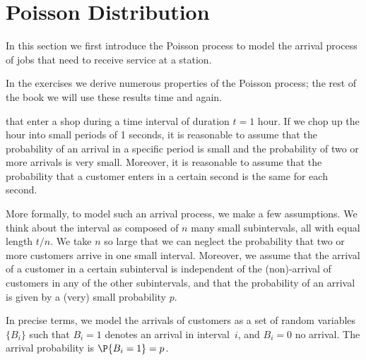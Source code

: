 


\section{Poisson Distribution}\label{sec:poisson-distribution}

In this section we first introduce the Poisson process to model the arrival process of jobs
that need to receive service at a station.

In the exercises we derive numerous properties of the Poisson process; the rest of the book we will use these results time and again.



 that enter a shop during a time interval of duration $t=1$ hour.
If we chop up the hour into small periods of 1 seconds, it is reasonable to assume that the probability of an arrival in a specific period is small and the probability of two or more arrivals is very small.
Moreover, it is reasonable to assume that the probability that a customer enters in a certain second is the same for each second.

More formally, to model such an arrival process, we make a few assumptions.
We think about the interval as composed of $n$ many small subintervals, all with equal length $t/n$.
We take $n$  so large that we can neglect the probability that two or more customers arrive in one small interval.
Moreover, we assume that the arrival of a customer in a certain subinterval is independent of the (non)-arrival of customers in any of the other subintervals, and that the probability of an arrival is given by a (very) small probability $p$.

In precise terms, we model the arrivals of customers as a set of   random variables $\{B_i\}$  such that $B_i=1$ denotes an arrival in interval~$i$, and $B_i=0$ no arrival.  The arrival probability is $\P{B_i =1}=p$.

